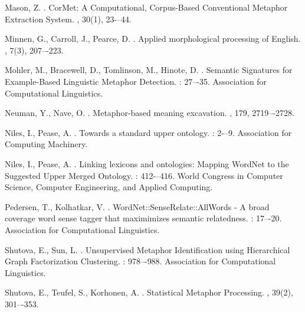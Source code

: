 \documentclass[11pt]{article}
\begin{document}
\begin{thebibliography}{}
Mason, Z. 
.
\newblock CorMet: A Computational, Corpus-Based Conventional Metaphor Extraction System.
, 30(1), 23-–44.

Minnen, G., Carroll, J., Pearce, D. 
.
\newblock Applied morphological processing of English.
, 7(3), 207–-223.

Mohler, M., Bracewell, D., Tomlinson, M., Hinote, D. 
.
\newblock Semantic Signatures for Example-Based Linguistic Metaphor Detection.
: 27–-35. Association for Computational Linguistics.

Neuman, Y., Nave, O. 
.
\newblock Metaphor-based meaning excavation.
, 179, 2719–-2728.

Niles, I., Pease, A. 
.
\newblock Towards a standard upper ontology.
: 2-–9. Association for Computing Machinery.

Niles, I., Pease, A. 
.
\newblock Linking lexicons and ontologies: Mapping WordNet to the Suggested Upper Merged Ontology.
: 412-–416. World Congress in Computer Science, Computer Engineering, and Applied Computing.

Pedersen, T., Kolhatkar, V. 
.
\newblock WordNet::SenseRelate::AllWords - A broad coverage word sense tagger that maximimizes semantic relatedness.
: 17–-20. Association for Computational Linguistics.

Shutova, E., Sun, L. 
.
\newblock Unsupervised Metaphor Identification using Hierarchical Graph Factorization Clustering.
: 978–-988. Association for Computational Linguistics.

Shutova, E., Teufel, S., Korhonen, A. 
.
\newblock Statistical Metaphor Processing.
, 39(2), 301–-353.


\end{thebibliography}
\end{document}
